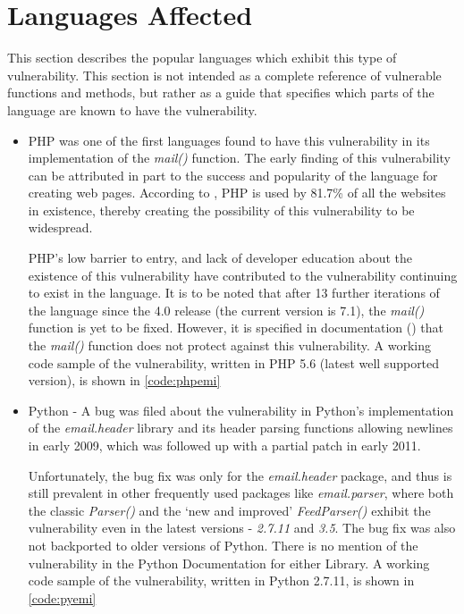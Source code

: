 \section{Languages Affected}

This section describes the popular languages which exhibit this type of vulnerability. This section is not intended as a complete reference of vulnerable functions and methods, but rather as a guide that specifies which parts of the language are known to have the vulnerability.
\begin{itemize}
	\item PHP was one of the first languages found to have this vulnerability in its implementation of the \emph{mail()} function. The early finding of this vulnerability can be attributed in part to the success and popularity of the language for creating web pages. According to \cite{W3techs}, PHP is used by 81.7\% of all the websites in existence, thereby creating the possibility of this vulnerability to be widespread. 
	
	PHP's low barrier to entry, and lack of developer education about the existence of this vulnerability have contributed to the vulnerability continuing to exist in the language.
	It is to be noted that after 13 further iterations of the language since the 4.0 release (the current version is 7.1), the \emph{mail()} function is yet to be fixed. However, it is specified in documentation (\cite{PHPDocs}) that the \emph{mail()} function does not protect against this vulnerability.
	A working code sample of the vulnerability, written in PHP 5.6 (latest well supported version), is shown in  \ref{code:phpemi}
	
	
	\item Python - A bug was filed about the vulnerability in Python's implementation of the \emph{email.header} library and its header parsing functions allowing newlines in early 2009, which was followed up with a partial patch in early 2011. 
	
	Unfortunately, the bug fix was only for the \emph{email.header} package, and thus is still prevalent in other frequently used packages like \emph{email.parser}, where both the classic \emph{Parser()} and the `new and improved' \emph{FeedParser()} exhibit the vulnerability even in the latest versions - \emph{2.7.11} and \emph{3.5}. The bug fix was also not backported to older versions of Python. 
	There is no mention of the vulnerability in the Python Documentation for either Library.
	A working code sample of the vulnerability, written in Python 2.7.11, is shown in \ref{code:pyemi}
	
	

\end{itemize}
